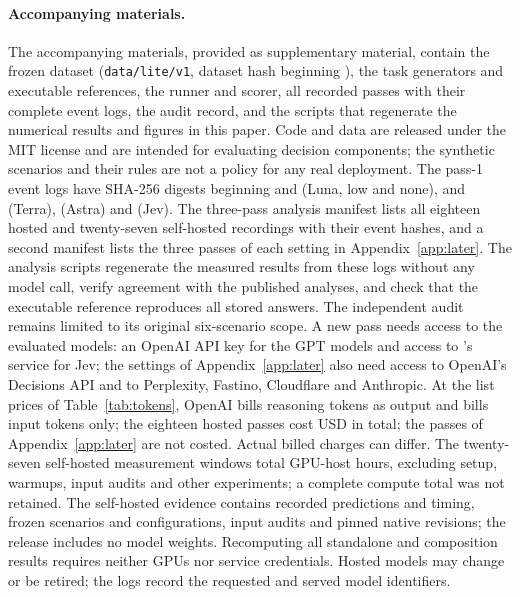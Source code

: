 \paragraph{Accompanying materials.}
The accompanying materials, provided as supplementary material, contain the frozen dataset (\texttt{data/lite/v1}, dataset hash beginning \texttt{\DatasetHashShort}), the task generators and executable references, the runner and scorer, all recorded passes with their complete event logs, the audit record, and the scripts that regenerate the numerical results and figures in this paper.
Code and data are released under the MIT license and are intended for evaluating decision components; the synthetic scenarios and their rules are not a policy for any real deployment.
The pass-1 event logs have SHA-256 digests beginning \texttt{\LunaEventsHash} and \texttt{\LunaNoneEventsHash} (Luna, low and none), \texttt{\TerraEventsHash} and \texttt{\TerraNoneEventsHash} (Terra), \texttt{\AstraEventsHash} (Astra) and \texttt{\JevEventsHash} (Jev).
The three-pass analysis manifest lists all eighteen hosted and twenty-seven self-hosted recordings with their event hashes, and a second manifest lists the three passes of each setting in Appendix~\ref{app:later}. The analysis scripts regenerate the measured results from these logs without any model call, verify agreement with the published analyses, and check that the executable reference reproduces all \NumStates{} stored answers. The independent audit remains limited to its original six-scenario scope.
A new pass needs access to the evaluated models: an OpenAI API key for the GPT models and access to \JevProvider's service for Jev; the settings of Appendix~\ref{app:later} also need access to OpenAI's Decisions API and to Perplexity, Fastino, Cloudflare and Anthropic.
At the list prices of Table~\ref{tab:tokens}, OpenAI bills reasoning tokens as output and \JevProvider{} bills input tokens only; the eighteen hosted passes cost \CostTotalUSD{} USD in total; the passes of Appendix~\ref{app:later} are not costed. Actual billed charges can differ. The twenty-seven self-hosted measurement windows total \OwMeasuredHours{} GPU-host hours, excluding setup, warmups, input audits and other experiments; a complete compute total was not retained.
The self-hosted evidence contains recorded predictions and timing, frozen scenarios and configurations, input audits and pinned native revisions; the release includes no model weights. Recomputing all standalone and composition results requires neither GPUs nor service credentials.
Hosted models may change or be retired; the logs record the requested and served model identifiers.

